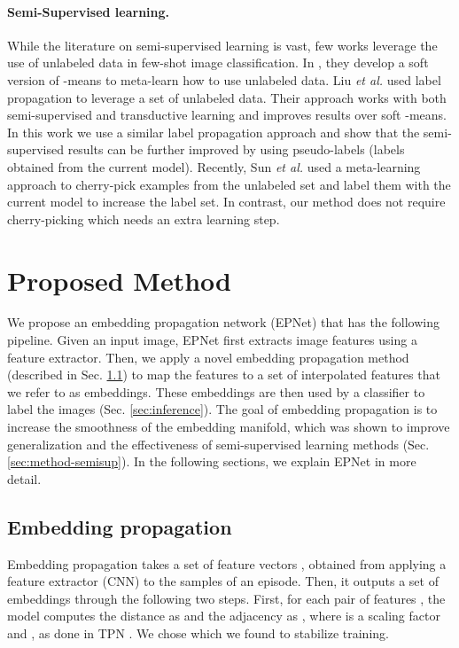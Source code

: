 \documentclass[runningheads]{llncs}
\begin{document}
\paragraph{Semi-Supervised learning.} 
While the literature on semi-supervised learning is vast, few works leverage the use of unlabeled data in few-shot image classification. In \cite{ren2018metalearning}, they develop a soft version of -means to meta-learn how to use unlabeled data. Liu \emph{et al.} \cite{liu2018learning,liu2019deep} used label propagation to leverage a set of unlabeled data. Their approach works with both semi-supervised and transductive learning and improves results over soft -means. In this work we use a similar label propagation approach and show that the semi-supervised results can be further improved by using pseudo-labels (labels obtained from the current model). Recently, Sun \emph{et al.} \cite{sun2019learning} used a meta-learning approach to cherry-pick examples from the unlabeled set and label them with the current model to increase the label set. In contrast, our method does not require cherry-picking which needs an extra learning step.
 
\section{Proposed Method}
\label{sec:proposed_method}
We propose an embedding propagation network (EPNet) that has the following pipeline. Given an input image, EPNet first extracts image features using a feature extractor. Then, we apply a novel embedding propagation method (described in Sec. \ref{sec:embedding-propagation}) to map the features to a set of  interpolated features that we refer to as embeddings. These embeddings are then used by a classifier to label the images (Sec. \ref{sec:inference}).  The goal of embedding propagation is  to increase the smoothness of the embedding manifold, which was shown to improve generalization \cite{bartlett1999generalization,lee1995lower} and the effectiveness of semi-supervised learning methods \cite{chapelle2009semi} (Sec. \ref{sec:method-semisup}). In the following sections, we explain EPNet in more detail.


\subsection{Embedding propagation} \label{sec:embedding-propagation}
Embedding propagation takes a set of feature vectors , obtained from applying a feature extractor (CNN) to the samples of an episode.  Then, it outputs a set of embeddings  through the following two steps. First, for each pair of features , the model computes the distance as   and the adjacency as , where  is a scaling factor and ,  as done in TPN \cite{liu2018learning}.  We chose  which we found to stabilize training. 
\end{document}
